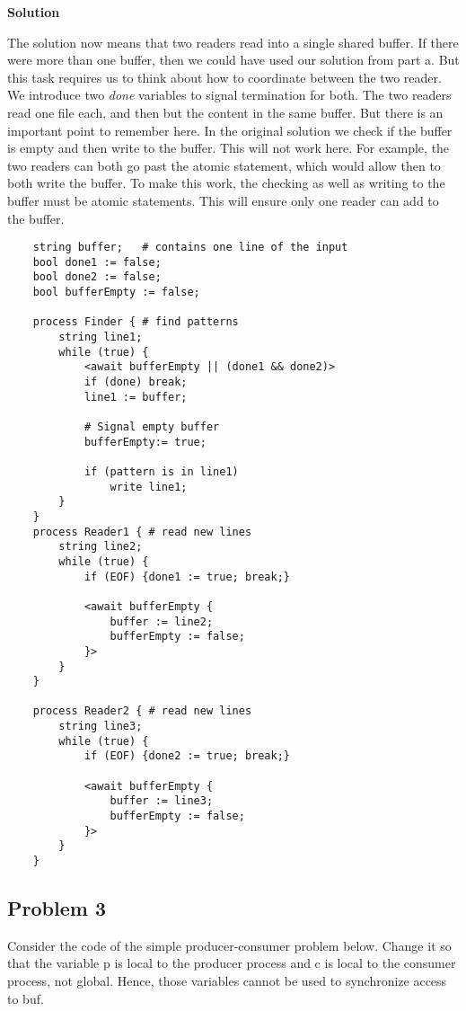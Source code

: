 \textbf{Solution}

The solution now means that two readers read into a single shared buffer. If there were more than one buffer, then we could have used our solution from part a.
But this task requires us to think about how to coordinate between the two reader. We introduce two \textit{done} variables to signal termination for both. 
The two readers read one file each, and then but the content in the same buffer. But there is an important point to remember here. 
In the original solution we check if the buffer is empty and then write to the buffer. This will not work here. For example, the two readers can both go past the atomic statement, which would allow then to both write the buffer.
To make this work, the checking as well as writing to the buffer must be atomic statements. This will ensure only one reader can add to the buffer.

\begin{lstlisting}
    string buffer;   # contains one line of the input
    bool done1 := false;
    bool done2 := false; 
    bool bufferEmpty := false; 

    process Finder { # find patterns
        string line1;
        while (true) {
            <await bufferEmpty || (done1 && done2)>
            if (done) break;
            line1 := buffer;

            # Signal empty buffer 
            bufferEmpty:= true;
         
            if (pattern is in line1)
                write line1;
        }
    }
    process Reader1 { # read new lines
        string line2;
        while (true) {
            if (EOF) {done1 := true; break;}

            <await bufferEmpty {
                buffer := line2;
                bufferEmpty := false; 
            }>
        }
    }

    process Reader2 { # read new lines
        string line3;
        while (true) {
            if (EOF) {done2 := true; break;}

            <await bufferEmpty {
                buffer := line3;
                bufferEmpty := false; 
            }>
        }
    }
\end{lstlisting}


\subsection{Problem 3}

Consider the code of the simple producer-consumer problem below. Change it so that the variable p is local to the producer process
and c is local to the consumer process, not global. Hence, those variables cannot be used to
synchronize access to buf.


